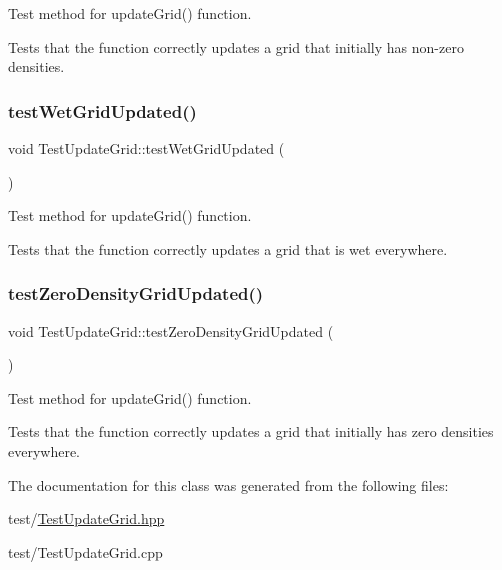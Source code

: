 Test method for update\+Grid() function. 

Tests that the function correctly updates a grid that initially has non-\/zero densities. \mbox{\label{class_test_update_grid_a96aa33a3e1362f9a24237c234a13f3b9}} 
\subsubsection{\texorpdfstring{test\+Wet\+Grid\+Updated()}{testWetGridUpdated()}}
{\footnotesize\ttfamily void Test\+Update\+Grid\+::test\+Wet\+Grid\+Updated (\begin{DoxyParamCaption}{ }\end{DoxyParamCaption})\hspace{0.3cm}{\ttfamily [protected]}}



Test method for update\+Grid() function. 

Tests that the function correctly updates a grid that is wet everywhere. \mbox{\label{class_test_update_grid_ac9edeb07286572669ab1464895f3f452}} 
\subsubsection{\texorpdfstring{test\+Zero\+Density\+Grid\+Updated()}{testZeroDensityGridUpdated()}}
{\footnotesize\ttfamily void Test\+Update\+Grid\+::test\+Zero\+Density\+Grid\+Updated (\begin{DoxyParamCaption}{ }\end{DoxyParamCaption})\hspace{0.3cm}{\ttfamily [protected]}}



Test method for update\+Grid() function. 

Tests that the function correctly updates a grid that initially has zero densities everywhere. 

The documentation for this class was generated from the following files\+:\begin{DoxyCompactItemize}
\item 
test/\hyperlink{_test_update_grid_8hpp}{Test\+Update\+Grid.\+hpp}\item 
test/Test\+Update\+Grid.\+cpp\end{DoxyCompactItemize}
